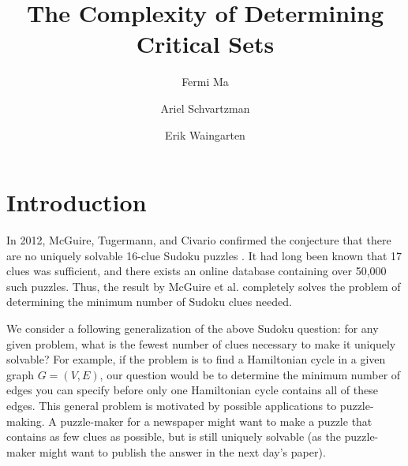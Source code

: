 \documentclass[runningheads,a4paper]{llncs}
\begin{document}
\mainmatter  %

\title{The Complexity of Determining Critical Sets}


%
%
\author{Fermi Ma \and Ariel Schvartzman \and Erik Waingarten}
%


%
%

\maketitle

\section{Introduction}

In 2012, McGuire, Tugermann, and Civario confirmed the conjecture that there are no uniquely solvable 16-clue Sudoku puzzles \cite{mcguire2012there}. It had long been known that 17 clues was sufficient, and there exists an online database containing over 50,000 such puzzles. Thus, the result by McGuire et al. completely solves the problem of determining the minimum number of Sudoku clues needed.

We consider a following generalization of the above Sudoku question: for any given problem, what is the fewest number of clues necessary to make it uniquely solvable? For example, if the problem is to find a Hamiltonian cycle in a given graph $G = (V,E)$, our question would be to determine the minimum number of edges you can specify before only one Hamiltonian cycle contains all of these edges. This general problem is motivated by possible applications to puzzle-making. A puzzle-maker for a newspaper might want to make a puzzle that contains as few clues as possible, but is still uniquely solvable (as the puzzle-maker might want to publish the answer in the next day's paper).
\end{document}
